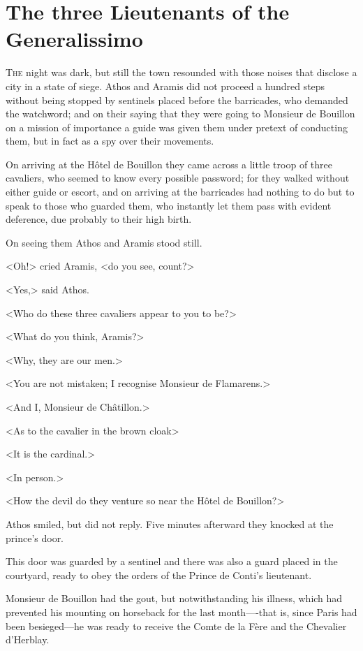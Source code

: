 \chapter{The three Lieutenants of the Generalissimo}

 \lettrine{T}{he} night was dark, but still the town resounded with those noises that disclose a city in a state of siege. Athos and Aramis did not proceed a hundred steps without being stopped by sentinels placed before the barricades, who demanded the watchword; and on their saying that they were going to Monsieur de Bouillon on a mission of importance a guide was given them under pretext of conducting them, but in fact as a spy over their movements.

On arriving at the Hôtel de Bouillon they came across a little troop of three cavaliers, who seemed to know every possible password; for they walked without either guide or escort, and on arriving at the barricades had nothing to do but to speak to those who guarded them, who instantly let them pass with evident deference, due probably to their high birth.

On seeing them Athos and Aramis stood still.

<Oh!> cried Aramis, <do you see, count?>

<Yes,> said Athos.

<Who do these three cavaliers appear to you to be?>

<What do you think, Aramis?>

<Why, they are our men.>

<You are not mistaken; I recognise Monsieur de Flamarens.>

<And I, Monsieur de Châtillon.>

<As to the cavalier in the brown cloak\longdash>

<It is the cardinal.>

<In person.>

<How the devil do they venture so near the Hôtel de Bouillon?>

Athos smiled, but did not reply. Five minutes afterward they knocked at the prince's door.

This door was guarded by a sentinel and there was also a guard placed in the courtyard, ready to obey the orders of the Prince de Conti's lieutenant.

Monsieur de Bouillon had the gout, but notwithstanding his illness, which had prevented his mounting on horseback for the last month—-that is, since Paris had been besieged—he was ready to receive the Comte de la Fère and the Chevalier d'Herblay.

